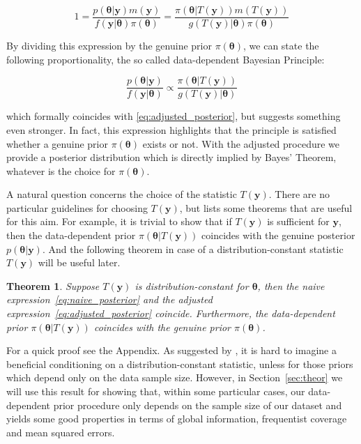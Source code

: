 \documentclass{statsoc}
\newtheorem{thm}{Theorem}
\begin{document}
\begin{equation}
1= \frac{p( \bm{\theta}| \bm{y})m(\bm{y})}{f(\bm{y}|\bm{\theta}   )\pi(\bm{\theta})}=  \frac{\pi(\bm{\theta}| T( \bm{y}))m( T( \bm{y}))}{g( T( \bm{y})| \bm{\theta}) \pi(\bm{\theta})}
\label{eq:bayesian_comparison}
\end{equation}


By dividing this expression by the genuine prior $\pi(\bm{\theta})$, we can state the following proportionality, the so called data-dependent Bayesian Principle:

\begin{equation}
\frac{p( \bm{\theta}| \bm{y})}{f(\bm{y}|\bm{\theta}   )}\propto \frac{\pi(\bm{\theta}| T( \bm{y}))}{g( T( \bm{y})| \bm{\theta})}
\label{eq:bayesian_principle}
\end{equation}

which formally coincides with \eqref{eq:adjusted_posterior}, but suggests something even stronger. In fact, this expression highlights that the principle is satisfied whether a genuine prior $\pi(\bm{\theta})$ exists or not. With the adjusted procedure we provide a posterior distribution which is directly implied by Bayes' Theorem, whatever is the choice for $\pi(\bm{\theta})$.

A natural question concerns the choice of the statistic $T(\bm{y})$. There are no particular guidelines for choosing $T(\bm{y})$, but \cite{darnieder2011bayesian} lists some theorems that are useful for this aim. For example, it is trivial to show that if $T(\bm{y})$ is sufficient for $\bm{y}$, then the data-dependent prior $\pi(\bm{\theta}| T( \bm{y}))$ coincides with the genuine posterior $p( \bm{\theta}| \bm{y})$. And the following theorem in case of a distribution-constant statistic $T(\bm{y})$ will be useful later.

\begin{thm}
Suppose $T(\bm{y})$ is distribution-constant for $\bm{\theta}$, then the naive expression~\eqref{eq:naive_posterior} and the adjusted expression~\eqref{eq:adjusted_posterior} coincide. Furthermore, the data-dependent prior $\pi(\bm{\theta}| T( \bm{y}))$ coincides with the genuine prior $\pi(\bm{\theta})$.
\label{eq:thm_1}
\end{thm}

For a quick proof see the Appendix. As suggested by \cite{darnieder2011bayesian}, it is hard to imagine a beneficial conditioning on a distribution-constant statistic, unless for those priors which depend only on the data sample size. However, in Section~\ref{sec:theor} we will use this result for showing that, within some particular cases, our data-dependent prior procedure only depends on the sample size of our dataset and yields some good properties in terms of global information, frequentist coverage and mean squared errors.
\end{document}
